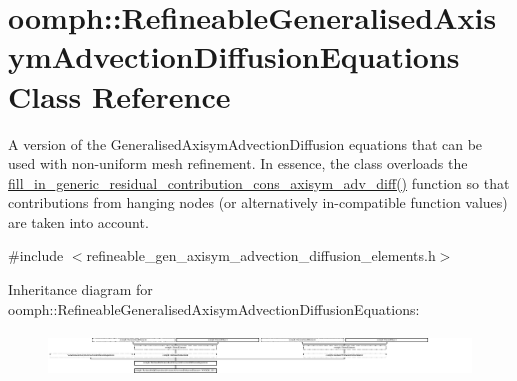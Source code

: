 \hypertarget{classoomph_1_1RefineableGeneralisedAxisymAdvectionDiffusionEquations}{}\section{oomph\+:\+:Refineable\+Generalised\+Axisym\+Advection\+Diffusion\+Equations Class Reference}
\label{classoomph_1_1RefineableGeneralisedAxisymAdvectionDiffusionEquations}


A version of the Generalised\+Axisym\+Advection\+Diffusion equations that can be used with non-\/uniform mesh refinement. In essence, the class overloads the \hyperlink{classoomph_1_1RefineableGeneralisedAxisymAdvectionDiffusionEquations_ac8c288d66e8d577940a4a4ee9c6ebab9}{fill\+\_\+in\+\_\+generic\+\_\+residual\+\_\+contribution\+\_\+cons\+\_\+axisym\+\_\+adv\+\_\+diff()} function so that contributions from hanging nodes (or alternatively in-\/compatible function values) are taken into account.  




{\ttfamily \#include $<$refineable\+\_\+gen\+\_\+axisym\+\_\+advection\+\_\+diffusion\+\_\+elements.\+h$>$}

Inheritance diagram for oomph\+:\+:Refineable\+Generalised\+Axisym\+Advection\+Diffusion\+Equations\+:\begin{figure}[H]
\begin{center}
\leavevmode
\includegraphics[height=1.157025cm]{classoomph_1_1RefineableGeneralisedAxisymAdvectionDiffusionEquations}
\end{center}
\end{figure}

